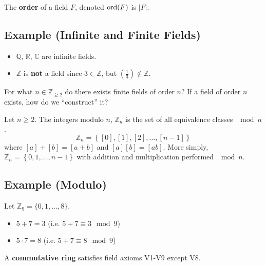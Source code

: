 \begin{defbox}
    \begin{definition}
    The \textbf{order} of a field $ F $, denoted $ \operatorname{ord}(F) $ is $ |F| $.
\end{definition} \end{defbox}

\begin{exbox}
    \subsection{Example (Infinite and Finite Fields)}
    \begin{itemize}
        \item $ \mathbb{Q},\,\mathbb{R},\,\mathbb{C} $ are infinite fields.
        \item $ \mathbb{Z} $ is \textbf{not} a field since $ 3\in\mathbb{Z} $, but
        $ (\frac{1}{3})\notin\mathbb{Z} $.
    \end{itemize}
\end{exbox}

 For what $ n\in\mathbb{Z}_{\geqslant 2} $ do there exists
finite fields of order $ n $? If a field of order $ n $ exists, how do
we ``construct'' it?

 Let $ n\geqslant 2 $. The integers modulo $ n $,
$ \mathbb{Z}_n $ is the set of all equivalence classes $ \mod n $.
\[ \mathbb{Z}_n=\left\{ [0],[1],[2],\ldots ,[n-1]\right\} \]
where $ [a]+[b]=[a+b] $ and $ [a][b]=[ab] $.
More simply, $ \mathbb{Z}_{n}=\left\{ 0,1,\ldots ,n-1\right\} $
with addition and multiplication performed $ \mod n $.

\begin{exbox}
    \subsection{Example (Modulo)}
    Let $ \mathbb{Z}_9=\{0,1,\ldots ,8\} $.
    \begin{itemize}
        \item $ 5+7=3 $ (i.e. $ 5+7\equiv 3 \mod 9 $)
        \item $ 5\cdot 7=8 $ (i.e. $ 5+7\equiv 8 \mod 9 $)
    \end{itemize}
\end{exbox}

\begin{defbox}
    \begin{definition}
    A \textbf{commutative ring} satisfies field axioms V1-V9 except
    V8.
\end{definition} \end{defbox}

